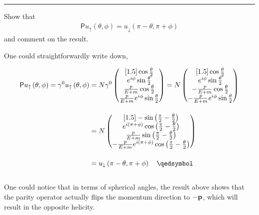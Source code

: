 \noindent\rule{7in}{1.5pt}


\begin{problem}{4.13}
Show that
\begin{align*}
     \mathsf{P} u_\uparrow \left( \theta,\phi \right) = u_\downarrow \left( \pi-\theta,\pi+\phi \right)
\end{align*}
and comment on the result.
\end{problem}
\begin{solution}
One could straightforwardly write down,

\begin{align*}
    \mathsf{P}u_\uparrow\left(\theta,\phi\right) = \gamma^0 u_\uparrow\left(\theta,\phi\right) &= N \gamma^0 \begin{pmatrix}[1.5] 
        \cos \frac{\theta}{2} \\
        e^{i\phi} \sin \frac{\theta}{2} \\
        \frac{p}{E+m} \cos \frac{\theta}{2} \\
        \frac{p}{E+m} e^{i\phi} \sin \frac{\theta}{2} \\
    \end{pmatrix} = N  \begin{pmatrix}[1.5] 
        \cos \frac{\theta}{2} \\
        e^{i\phi} \sin \frac{\theta}{2} \\
        -\frac{p}{E+m} \cos \frac{\theta}{2} \\
        -\frac{p}{E+m} e^{i\phi} \sin \frac{\theta}{2} \\
    \end{pmatrix} \\[0.15in]
    &= N  \begin{pmatrix}[1.5] 
        - \sin \left(\frac{\pi}{2} - \frac{\theta}{2}\right) \\
        e^{i(\pi+\phi)} \cos \left(\frac{\pi}{2} - \frac{\theta}{2}\right) \\
         \frac{p}{E+m} \sin \left(\frac{\pi}{2} - \frac{\theta}{2}\right) \\
        -\frac{p}{E+m} e^{i(\pi+\phi)} \cos  \left(\frac{\pi}{2} - \frac{\theta}{2}\right) \\
    \end{pmatrix} \\[0.15in]
    &= u_\downarrow \left( \pi-\theta,\pi+\phi\right) \qed
\end{align*}\\
One could notice that in terms of spherical angles, the result above shows that the parity operator actually flips the momentum direction to $-\mathbf{p}$, which will result in the opposite helicity.
\end{solution}

